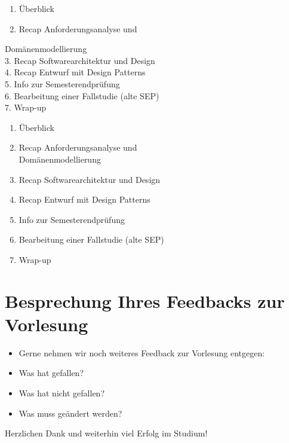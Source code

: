 \documentclass[10pt]{article}
\begin{document}
\begin{enumerate}
  \item Überblick
  \item Recap Anforderungsanalyse und
\end{enumerate}

Domänenmodellierung\\
3. Recap Softwarearchitektur und Design\\
4. Recap Entwurf mit Design Patterns\\
5. Info zur Semesterendprüfung\\
6. Bearbeitung einer Fallstudie (alte SEP)\\
7. Wrap-up

\begin{enumerate}
  \item Überblick
  \item Recap Anforderungsanalyse und\\
Domänenmodellierung
  \item Recap Softwarearchitektur und Design
  \item Recap Entwurf mit Design Patterns
  \item Info zur Semesterendprüfung
  \item Bearbeitung einer Fallstudie (alte SEP)
  \item Wrap-up
\end{enumerate}

\section*{Besprechung Ihres Feedbacks zur Vorlesung}
\begin{itemize}
  \item Gerne nehmen wir noch weiteres Feedback zur Vorlesung entgegen:
  \item Was hat gefallen?
  \item Was hat nicht gefallen?
  \item Was muss geändert werden?
\end{itemize}

Herzlichen Dank und weiterhin viel Erfolg im Studium!
\end{document}
